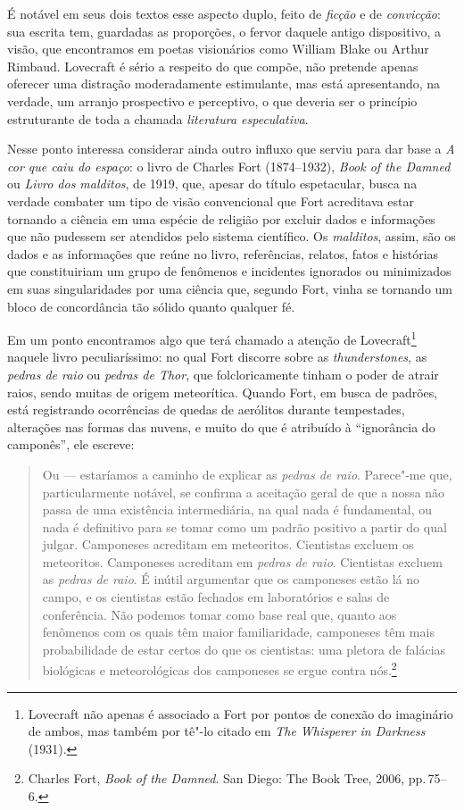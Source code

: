 É notável em seus dois textos esse aspecto duplo, feito de \textit{ficção}
e de \textit{convicção}:\,sua escrita tem, guardadas as proporções, o
fervor daquele antigo dispositivo, a visão, que encontramos em poetas
visionários como William Blake ou Arthur Rimbaud. Lovecraft é sério a
respeito do que compõe, não pretende apenas oferecer uma distração
moderadamente estimulante, mas está apresentando, na verdade, um arranjo
prospectivo e perceptivo, o que deveria ser o princípio estruturante de
toda a chamada \textit{literatura especulativa}.

Nesse ponto interessa considerar ainda outro influxo que serviu para dar
base a \textit{A cor que caiu do espaço}: o livro de Charles Fort
(1874--1932), \textit{Book of the Damned} ou \textit{Livro dos malditos}, de 1919, que,
apesar do título espetacular, busca na verdade combater um tipo de visão
convencional que Fort acreditava estar tornando a ciência em uma espécie
de religião por excluir dados e informações que não pudessem ser
atendidos pelo sistema científico. Os \textit{malditos}, assim, são os dados
e as informações que reúne no livro, referências, relatos, fatos e
histórias que constituiriam um grupo de fenômenos e incidentes
ignorados ou minimizados em suas singularidades por uma ciência que,
segundo Fort, vinha se tornando um bloco de concordância tão sólido
quanto qualquer fé.

Em um ponto encontramos algo que terá chamado a atenção de
Lovecraft\footnote{Lovecraft não apenas é associado a Fort por pontos de
  conexão do imaginário de ambos, mas também por tê"-lo citado em \textit{The
  Whisperer in Darkness} (1931).} naquele livro peculiaríssimo:
no qual Fort discorre sobre as \textit{thunderstones}, as \textit{pedras de raio} ou
\textit{pedras de Thor}, que folcloricamente tinham o poder de atrair raios,
sendo muitas de origem meteorítica. Quando Fort, em busca de
padrões, está registrando ocorrências de quedas de aerólitos durante
tempestades, alterações nas formas das nuvens, e muito do que é
atribuído à ``ignorância do camponês'', ele escreve:

\begin{quote}
Ou --- estaríamos a caminho de explicar as \textit{pedras de raio}. Parece"-me
que, particularmente notável, se confirma a aceitação geral de que a
nossa não passa de uma existência intermediária, na qual nada é
fundamental, ou nada é definitivo para se tomar como um padrão positivo
a partir do qual julgar. Camponeses acreditam em meteoritos. Cientistas
excluem os meteoritos. Camponeses acreditam em \textit{pedras de raio}.
Cientistas excluem as \textit{pedras de raio}. É inútil argumentar que os
camponeses estão lá no campo, e os cientistas estão fechados em
laboratórios e salas de conferência. Não podemos tomar como base real
que, quanto aos fenômenos com os quais têm maior familiaridade,
camponeses têm mais probabilidade de estar certos do que os cientistas:
uma pletora de falácias biológicas e meteorológicas dos camponeses se
ergue contra nós.\footnote{Charles Fort, \textit{Book of the Damned}. San
  Diego: The Book Tree, 2006, pp.\,75--6.}
\end{quote}

